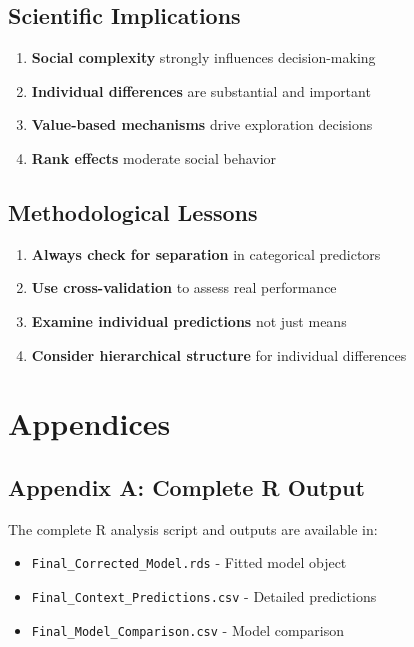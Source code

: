 \documentclass[11pt]{article}
\begin{document}
\subsection{Scientific Implications}

\begin{enumerate}
    \item \textbf{Social complexity} strongly influences decision-making
    \item \textbf{Individual differences} are substantial and important
    \item \textbf{Value-based mechanisms} drive exploration decisions
    \item \textbf{Rank effects} moderate social behavior
\end{enumerate}

\subsection{Methodological Lessons}

\begin{enumerate}
    \item \textbf{Always check for separation} in categorical predictors
    \item \textbf{Use cross-validation} to assess real performance
    \item \textbf{Examine individual predictions} not just means
    \item \textbf{Consider hierarchical structure} for individual differences
\end{enumerate}

\section{Appendices}

\subsection{Appendix A: Complete R Output}

The complete R analysis script and outputs are available in:
\begin{itemize}
    \item \texttt{Final\_Corrected\_Model.rds} - Fitted model object
    \item \texttt{Final\_Context\_Predictions.csv} - Detailed predictions
    \item \texttt{Final\_Model\_Comparison.csv} - Model comparison
\end{itemize}
\end{document}
